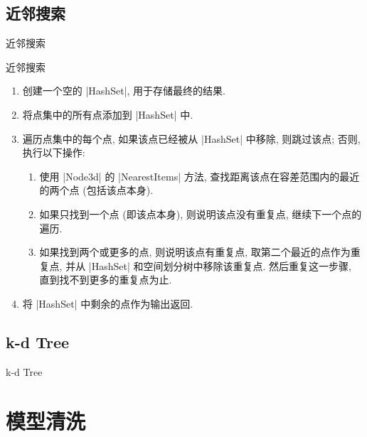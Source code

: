 \documentclass[lang = zh]{ibeamer}
\begin{document}
\subsection{近邻搜索}

\begin{frame}{近邻搜索}
\end{frame}

\begin{frame}{近邻搜索}
  \begin{enumerate}
    \item 创建一个空的 |HashSet|, 用于存储最终的结果.
    \item 将点集中的所有点添加到 |HashSet| 中.
    \item 遍历点集中的每个点, 如果该点已经被从 |HashSet| 中移除, 则跳过该点; 否则, 执行以下操作:
          \begin{enumerate}
            \item 使用 |Node3d| 的 |NearestItems| 方法, 查找距离该点在容差范围内的最近的两个点 (包括该点本身).
            \item 如果只找到一个点 (即该点本身), 则说明该点没有重复点, 继续下一个点的遍历.
            \item 如果找到两个或更多的点, 则说明该点有重复点, 取第二个最近的点作为重复点, 并从 |HashSet| 和空间划分树中移除该重复点.
                  然后重复这一步骤, 直到找不到更多的重复点为止.
          \end{enumerate}
    \item 将 |HashSet| 中剩余的点作为输出返回.
  \end{enumerate}
\end{frame}

\subsection{k-d Tree}

\begin{frame}{k-d Tree}
\end{frame}

\section{模型清洗}
\end{document}
